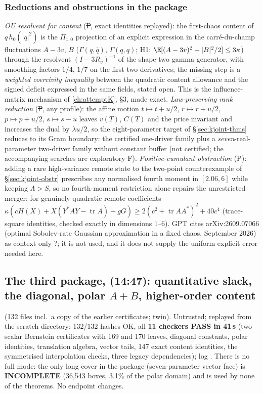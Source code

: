 \subsubsection{Reductions and obstructions in the package}
\emph{OU resolvent for content} (\st{P}, exact identities replayed): the first-chaos content of $q\,h_0(|q|^2)$ is the $\Pi_{1,0}$ projection of an explicit expression in the carré-du-champ
fluctuations $A-3v$, $B$ ($\Gamma(q,\bar q)$, $\Gamma(q,q)$; H1: $\E[(A-3v)^2+|B|^2/2]\le3\kappa$) through the resolvent $(I-3R_v)^{-1}$ of the shape-two gamma generator, with smoothing
factors $1/4$, $1/7$ on the first two derivatives; the missing step is a \emph{weighted coercivity inequality} between the quadratic content allowance and the signed deficit expressed in the
same fields, stated open. This is the influence-matrix mechanism of \autoref{ch:attemptK}, \S3, made exact. \emph{Law-preserving rank reduction} (\st{P}, any profile): the affine motion
$t\mapsto t+u/2$, $r\mapsto r+u/2$, $p\mapsto p+u/2$, $s\mapsto s-u$ leaves $v(T)$, $C(T)$ and the price invariant and increases the dual by $\lambda u/2$, so the eight-parameter target of
\S\ref{sec:kjoint-thms} reduces to its Gram boundary: the certified one-driver family plus a \emph{seven}-real-parameter two-driver family without constant buffer (not certified; the
accompanying searches are exploratory \st{F}). \emph{Positive-cumulant obstruction} (\st{P}): adding a rare high-variance remote state to the two-point counterexample of
\S\ref{sec:kjoint-obstr} prescribes any normalised fourth moment in $[2.06,6]$ while keeping $\Lambda>S$, so no fourth-moment restriction alone repairs the unrestricted merger; for genuinely
quadratic remote coefficients $\kappa(cH(X)+X(Y^*AY-\operatorname{tr}A)+gG)\ge2(c^2+\operatorname{tr}AA^*)^2+40c^4$ (trace-square identities, checked exactly in dimensions $1$--$6$).
GPT cites arXiv:2609.07066 (optimal Sobolev-rate Gaussian approximation in a fixed chaos, September 2026) as context only \st{?}; it is not used, and it does not supply the uniform explicit
error needed here.

\subsection{The third package,  (14:47): quantitative slack, the diagonal, polar $A{+}B$, higher-order content}\label{sec:knext}
 (132 files incl.\ a  copy of the earlier certificates;  twin). Untrusted;
replayed from the scratch directory: 132/132 hashes OK, all \textbf{11 checkers PASS in 41\,s} (two scalar Bernstein certificates with 169 and 170 leaves, diagonal constants, polar
identities, translation algebra, vector tails, 147 exact content identities, the symmetrised interpolation checks, three legacy dependencies); log
. There is no full mode: the only long cover in the package (seven-parameter vector face) is \textbf{INCOMPLETE} (36,543 boxes, 3.1\% of the
polar domain) and is used by none of the theorems. No endpoint changes.

